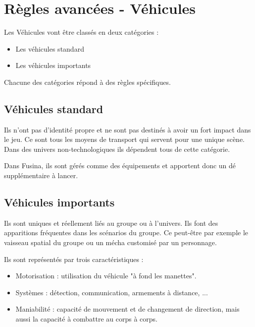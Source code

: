 \documentclass{conf/FusinaClass}
\begin{document}


\part{Règles avancées - Véhicules}
Les Véhicules vont être classés en deux catégories : 

\begin{itemize}
\item Les véhicules standard
\item Les véhicules importants
\end{itemize}

Chacune des catégories répond à des règles spécifiques.

\chapter{Véhicules standard}
Ils n'ont pas d'identité propre et ne sont pas destinés à avoir un fort impact dans le jeu. Ce sont tous les moyens de transport qui servent pour une unique scène. Dans des univers non-technologiques ils dépendent tous de cette catégorie.

Dans Fusina, ils sont gérés comme des équipements et apportent donc un dé supplémentaire à lancer.

\chapter{Véhicules importants}
Ils sont uniques et réellement liés au groupe ou à l'univers. Ils font des apparitions fréquentes dans les scénarios du groupe. Ce peut-être par exemple le vaisseau spatial du groupe ou un mécha customisé par un personnage.

Ils sont représentés par trois caractéristiques : 

\begin{itemize}
\item Motorisation : utilisation du véhicule "à fond les manettes".
\item Systèmes : détection, communication, armements à distance, ...
\item Maniabilité : capacité de mouvement et de changement de direction, mais aussi la capacité à combattre au corps à corps.
\end{itemize}
\end{document}
